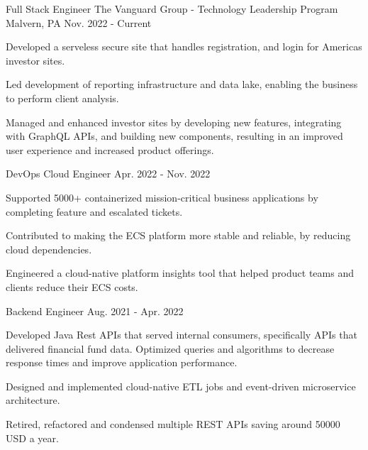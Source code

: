 

\begin{cventries}
  \cventry
    {Full Stack Engineer} %
    {The Vanguard Group - Technology Leadership Program} %
    {Malvern, PA} %
    {Nov. 2022 - Current} %
    {
      \begin{cvitems} %
        \item {Developed a serveless secure site that handles registration, and login for Americas investor sites.}
        \item {Led development of reporting infrastructure and data lake, enabling the business to perform client analysis.}
        \item {Managed and enhanced investor sites by developing new features, integrating with GraphQL APIs, and building new components, resulting in an improved user experience and increased product offerings.}
      \end{cvitems}
    }
  \cventry
    {DevOps Cloud Engineer} %
    {} %
    {} %
    {Apr. 2022 - Nov. 2022} %
    {
      \begin{cvitems} %
        \item {Supported 5000+ containerized mission-critical business applications by completing feature and escalated tickets.}
        \item {Contributed to making the ECS platform more stable and reliable, by reducing cloud dependencies.}
        \item {Engineered a cloud-native platform insights tool that helped product teams and clients reduce their ECS costs.}
      \end{cvitems}
    }
  \cventry
    {Backend Engineer} %
    {} %
    {} %
    {Aug. 2021 - Apr. 2022} %
    {
      \begin{cvitems} %
        \item {Developed Java Rest APIs that served internal consumers, specifically APIs that delivered financial fund data. Optimized queries and algorithms to decrease response times and improve application performance.}
        \item {Designed and implemented cloud-native ETL jobs and event-driven microservice architecture.}
        \item {Retired, refactored and condensed multiple REST APIs saving around 50000 USD a year.}
      \end{cvitems}
    }


\end{cventries}
